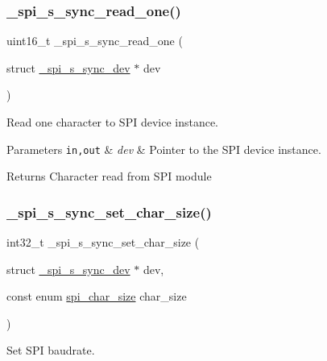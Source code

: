 \subsubsection{\texorpdfstring{\+\_\+spi\+\_\+s\+\_\+sync\+\_\+read\+\_\+one()}{\_spi\_s\_sync\_read\_one()}}
{\footnotesize\ttfamily uint16\+\_\+t \+\_\+spi\+\_\+s\+\_\+sync\+\_\+read\+\_\+one (\begin{DoxyParamCaption}\item[{struct \hyperlink{group__hpl__spi_ga36cf082f9d7764b69f43a52f039e7165}{\+\_\+spi\+\_\+s\+\_\+sync\+\_\+dev} $\ast$}]{dev }\end{DoxyParamCaption})}



Read one character to S\+PI device instance. 


\begin{DoxyParams}[1]{Parameters}
\mbox{\tt in,out}  & {\em dev} & Pointer to the S\+PI device instance.\\
\hline
\end{DoxyParams}
\begin{DoxyReturn}{Returns}
Character read from S\+PI module 
\end{DoxyReturn}
\mbox{\label{group__hpl__spi_ga986f5f676a69c705d5239fd53193864a}} 
\subsubsection{\texorpdfstring{\+\_\+spi\+\_\+s\+\_\+sync\+\_\+set\+\_\+char\+\_\+size()}{\_spi\_s\_sync\_set\_char\_size()}}
{\footnotesize\ttfamily int32\+\_\+t \+\_\+spi\+\_\+s\+\_\+sync\+\_\+set\+\_\+char\+\_\+size (\begin{DoxyParamCaption}\item[{struct \hyperlink{group__hpl__spi_ga36cf082f9d7764b69f43a52f039e7165}{\+\_\+spi\+\_\+s\+\_\+sync\+\_\+dev} $\ast$}]{dev,  }\item[{const enum \hyperlink{group__hpl__spi_ga4a3ef460c2cea333834811806f32d60a}{spi\+\_\+char\+\_\+size}}]{char\+\_\+size }\end{DoxyParamCaption})}



Set S\+PI baudrate. 


